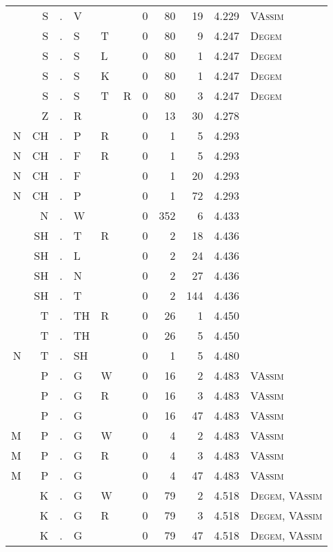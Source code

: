 \begin{longtable}{r@{ } r@{ } c@{ } l@{ } l@{ } l@{ } r r r r l }
  & S & . & V &   &   & 0 & 80 & 19 & 4.229 & \textsc{VAssim} \\
  & S & . & S & T &   & 0 & 80 & 9 & 4.247 & \textsc{Degem} \\
  & S & . & S & L &   & 0 & 80 & 1 & 4.247 & \textsc{Degem} \\
  & S & . & S & K &   & 0 & 80 & 1 & 4.247 & \textsc{Degem} \\
  & S & . & S & T & R & 0 & 80 & 3 & 4.247 & \textsc{Degem} \\
  & Z & . & R &   &   & 0 & 13 & 30 & 4.278 &  \\
N & CH & . & P & R &   & 0 & 1 & 5 & 4.293 &  \\
N & CH & . & F & R &   & 0 & 1 & 5 & 4.293 &  \\
N & CH & . & F &   &   & 0 & 1 & 20 & 4.293 &  \\
N & CH & . & P &   &   & 0 & 1 & 72 & 4.293 &  \\
  & N & . & W &   &   & 0 & 352 & 6 & 4.433 &  \\
  & SH & . & T & R &   & 0 & 2 & 18 & 4.436 &  \\
  & SH & . & L &   &   & 0 & 2 & 24 & 4.436 &  \\
  & SH & . & N &   &   & 0 & 2 & 27 & 4.436 &  \\
  & SH & . & T &   &   & 0 & 2 & 144 & 4.436 &  \\
  & T & . & TH & R &   & 0 & 26 & 1 & 4.450 &  \\
  & T & . & TH &   &   & 0 & 26 & 5 & 4.450 &  \\
N & T & . & SH &   &   & 0 & 1 & 5 & 4.480 &  \\
  & P & . & G & W &   & 0 & 16 & 2 & 4.483 & \textsc{VAssim} \\
  & P & . & G & R &   & 0 & 16 & 3 & 4.483 & \textsc{VAssim} \\
  & P & . & G &   &   & 0 & 16 & 47 & 4.483 & \textsc{VAssim} \\
M & P & . & G & W &   & 0 & 4 & 2 & 4.483 & \textsc{VAssim} \\
M & P & . & G & R &   & 0 & 4 & 3 & 4.483 & \textsc{VAssim} \\
M & P & . & G &   &   & 0 & 4 & 47 & 4.483 & \textsc{VAssim} \\
  & K & . & G & W &   & 0 & 79 & 2 & 4.518 & \textsc{Degem}, \textsc{VAssim} \\
  & K & . & G & R &   & 0 & 79 & 3 & 4.518 & \textsc{Degem}, \textsc{VAssim} \\
  & K & . & G &   &   & 0 & 79 & 47 & 4.518 & \textsc{Degem}, \textsc{VAssim} \\

\end{longtable}
